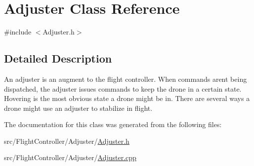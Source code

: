 \hypertarget{classAdjuster}{}\section{Adjuster Class Reference}
\label{classAdjuster}


{\ttfamily \#include $<$Adjuster.\+h$>$}



\subsection{Detailed Description}
An adjuster is an augment to the flight controller. When commands aren\textquotesingle{}t being dispatched, the adjuster issues commands to keep the drone in a certain state. Hovering is the most obvious state a drone might be in. There are several ways a drone might use an adjuster to stabilize in flight. 

The documentation for this class was generated from the following files\+:\begin{DoxyCompactItemize}
\item 
src/\+Flight\+Controller/\+Adjuster/\hyperlink{Adjuster_8h}{Adjuster.\+h}\item 
src/\+Flight\+Controller/\+Adjuster/\hyperlink{Adjuster_8cpp}{Adjuster.\+cpp}\end{DoxyCompactItemize}
